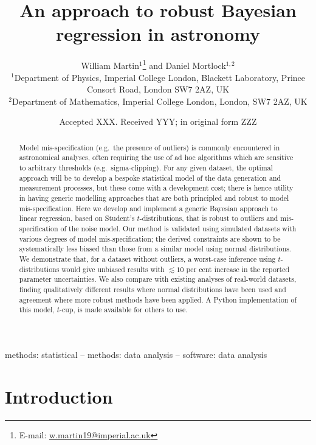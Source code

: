 \documentclass[fleqn,usenatbib]{rasti}
\title[Robust regression in astronomy]{An approach to robust Bayesian regression in astronomy}
\author[W. Martin \& D. Mortlock]{
William Martin$^{1}$\thanks{E-mail: \href{mailto:w.martin19@imperial.ac.uk}{w.martin19@imperial.ac.uk}}
and Daniel Mortlock$^{1,2}$
\\
$^{1}$Department of Physics, Imperial College London, Blackett Laboratory, Prince Consort Road, London SW7 2AZ, UK\\
$^{2}$Department of Mathematics, Imperial College London, London, SW7 2AZ, UK
}
\date{Accepted XXX. Received YYY; in original form ZZZ}
\begin{document}
\label{firstpage}
\pagerange{\pageref{firstpage}--\pageref{lastpage}}
\maketitle

\begin{abstract}
Model mis-specification (e.g.\ the presence of outliers) is commonly encountered
in astronomical analyses, often requiring the use of ad hoc algorithms  which
are sensitive to arbitrary thresholds (e.g.\ sigma-clipping). For any given
dataset, the optimal approach will be to develop a bespoke statistical model of
the data generation and measurement processes, but these come with a development
cost; there is hence utility in having generic modelling approaches that are
both principled and robust to model mis-specification. Here we develop and
implement a generic Bayesian approach to linear regression, based on Student's
$t$-distributions, that is robust to outliers and mis-specification of the noise
model. Our method is validated using simulated datasets with various degrees of
model mis-specification; the derived constraints are shown to be systematically
less biased than those from a similar model using normal distributions. We
demonstrate that, for a dataset without outliers, a worst-case inference using
$t$-distributions would give unbiased results with $\lesssim\!\!10$ per cent
increase in the reported parameter uncertainties. We also compare with existing
analyses of real-world datasets, finding qualitatively different results where
normal distributions have been used and agreement where more robust methods have
been applied. A Python implementation of this model, $t$-cup, is made available
for others to use.
\end{abstract}

\begin{keywords}
methods: statistical -- methods: data analysis -- software: data analysis
\end{keywords}



\section{Introduction}
\label{sec:intro}
\end{document}
